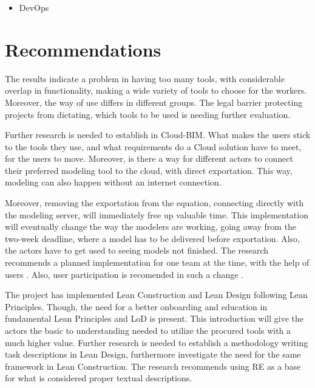 \begin{itemize}
    \item DevOps
\end{itemize}

\section{Recommendations}
The results indicate a problem in having too many tools, with considerable overlap in functionality, making a wide variety of tools to choose for the workers. Moreover, the way of use differs in different groups. The legal barrier protecting projects from dictating, which tools to be used is needing further evaluation. 

Further research is needed to establish in Cloud-BIM. What makes the users stick to the tools they use, and what requirements do a Cloud solution have to meet, for the users to move. Moreover, is there a way for different actors to connect their preferred modeling tool to the cloud, with direct exportation. This way, modeling can also happen without an internet connection. 

Moreover, removing the exportation from the equation, connecting directly with the modeling server, will immediately free up valuable time. This implementation will eventually change the way the modelers are working, going away from the two-week deadline, where a model has to be delivered before exportation. Also, the actors have to get used to seeing models not finished. The research recommends a planned implementation for one team at the time, with the help of users \cite{bratteteig2016unpacking}. Also, user participation is recomended in such a change \cite{hatling1998social, ehn1993scandinavian}.

The project has implemented Lean Construction and Lean Design following Lean Principles. Though, the need for a better onboarding and education in fundamental Lean Principles and LoD is present. This introduction will give the actors the basic to understanding needed to utilize the procured tools with a much higher value. Further research is needed to establish a methodology writing task descriptions in Lean Design, furthermore investigate the need for the same framework in Lean Construction. The research recommends using RE as a base for what is considered proper textual descriptions. 

\cleardoublepage
